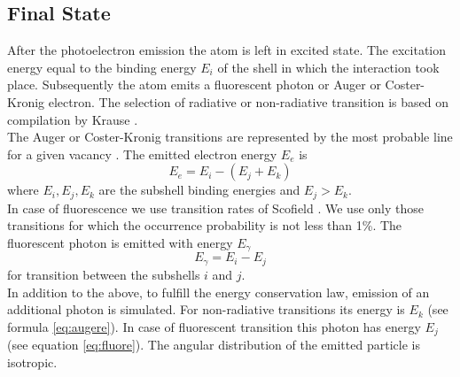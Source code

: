 \subsection{Final State}
 
After the photoelectron emission the atom is left in excited state.
The excitation energy equal to the binding energy $E_i$ of the shell in which the interaction took place. Subsequently the atom emits a fluorescent photon
or Auger or Coster-Kronig electron. The selection of radiative or
non-radiative transition is based on compilation by Krause \cite{bib-KRAUSE}.\\
The Auger or Coster-Kronig transitions are represented by the most probable
line for a given vacancy \cite{bib-CULLEN}. The emitted electron energy $E_e$ is
\begin{equation}
 E_e = E_i-(E_j+E_k)
\label{eq:augere}
\end{equation}
where
$E_i, E_j, E_k$ are the subshell binding energies and $E_j > E_k$.\\
In case of fluorescence we use transition rates of Scofield \cite{bib-SCOFIELD}.
We use only those transitions for which the occurrence probability is not less
than 1\%. The fluorescent photon is emitted with energy $E_\gamma$
\begin{equation}
E_\gamma = E_i-E_j
\label{eq:fluore}
\end{equation}
for transition between the subshells $i$ and $j$.\\
In addition to the above, to fulfill the energy conservation law,
emission of an additional photon is simulated. For non-radiative transitions 
its energy is $E_k$ (see formula \ref{eq:augere}). In case of fluorescent
transition this photon has energy $E_j$ (see equation \ref{eq:fluore}). 
The angular distribution of the emitted particle is isotropic.
